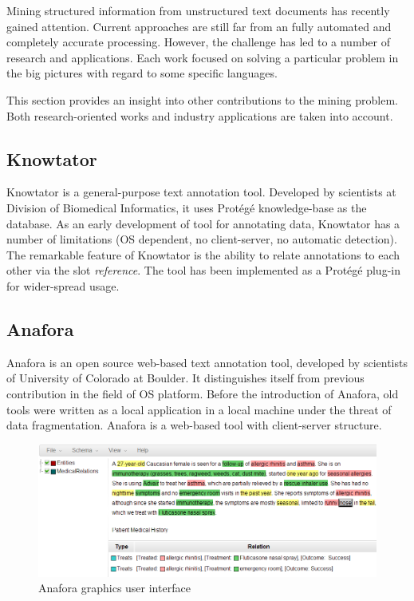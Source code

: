 
Mining structured information from unstructured text documents has recently gained attention.
Current approaches are still far from an fully automated and completely accurate processing.
However, the challenge has led to a number of research and applications.
Each work focused on solving a particular problem in the big pictures with regard to some specific languages. 

This section provides an insight into other contributions to the mining problem.
Both research-oriented works and industry applications are taken into account.

\subsection{Knowtator}
Knowtator is a general-purpose text annotation tool.
Developed by scientists at Division of Biomedical Informatics, 
it uses Protégé knowledge-base as the database.
As an early development of tool for annotating data, Knowtator has a number of limitations (OS dependent, no client-server, no automatic detection).
The remarkable feature of Knowtator is the ability to relate annotations to each other via the slot \textit{reference}.
The tool has been implemented as a Protégé plug-in for wider-spread usage.

\subsection{Anafora}

Anafora is an open source web-based text annotation tool,
developed by scientists of University of Colorado at Boulder.
It distinguishes itself from previous contribution in the field of OS platform.
Before the introduction of Anafora, old tools were written as a local application in a local machine under the threat of data fragmentation.
Anafora is a web-based tool with client-server structure. %

\begin{figure}[!htb]
	\centering
	\includegraphics[width=\textwidth]{Images/anafora}
	\caption{Anafora graphics user interface}
	\label{fig:First}
\end{figure}

